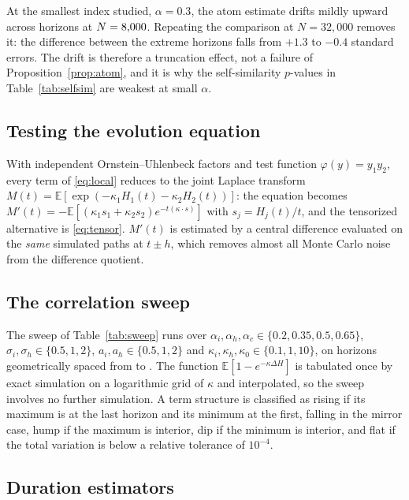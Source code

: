 \documentclass{ws-ijtaf}
\newcommand{\E}{\mathbb{E}}
\begin{document}
\begin{remark}
At the smallest index studied, $\alpha=0.3$, the atom estimate drifts mildly
upward across horizons at $N=8{,}000$. Repeating the comparison at
$N=32{,}000$ removes it: the difference between the extreme horizons falls from
$+1.3$ to $-0.4$ standard errors. The drift is therefore a truncation effect,
not a failure of Proposition~\ref{prop:atom}, and it is why the self-similarity
$p$-values in Table~\ref{tab:selfsim} are weakest at small $\alpha$.
\end{remark}

\subsection*{Testing the evolution equation}

With independent Ornstein--Uhlenbeck factors and test function
$\varphi(y)=y_1y_2$, every term of \eqref{eq:local} reduces to the joint Laplace
transform $M(t)=\E[\exp(-\kappa_1H_1(t)-\kappa_2H_2(t))]$: the equation becomes
$M'(t) = -\E[(\kappa_1s_1+\kappa_2s_2)e^{-t(\kappa\cdot s)}]$ with
$s_j=H_j(t)/t$, and the tensorized alternative is \eqref{eq:tensor}. $M'(t)$ is
estimated by a central difference evaluated on the \emph{same} simulated paths
at $t\pm h$, which removes almost all Monte Carlo noise from the difference
quotient.

\subsection*{The correlation sweep}

The sweep of Table~\ref{tab:sweep} runs over
$\alpha_i,\alpha_h,\alpha_c\in\{0.2,0.35,0.5,0.65\}$,
$\sigma_i,\sigma_h\in\{0.5,1,2\}$, $a_i,a_h\in\{0.5,1,2\}$ and
$\kappa_i,\kappa_h,\kappa_0\in\{0.1,1,10\}$, on \sweepNdeltas{} horizons
geometrically spaced from \sweepDeltaLo{} to \sweepDeltaHi{}. The function
$\E[1-e^{-\kappa\Delta H}]$ is tabulated once by exact simulation on a
logarithmic grid of $\kappa$ and interpolated, so the sweep involves no further
simulation. A term structure is classified as rising if its maximum is at the
last horizon and its minimum at the first, falling in the mirror case, hump if
the maximum is interior, dip if the minimum is interior, and flat if the total
variation is below a relative tolerance of $10^{-4}$.

\subsection*{Duration estimators}
\end{document}
